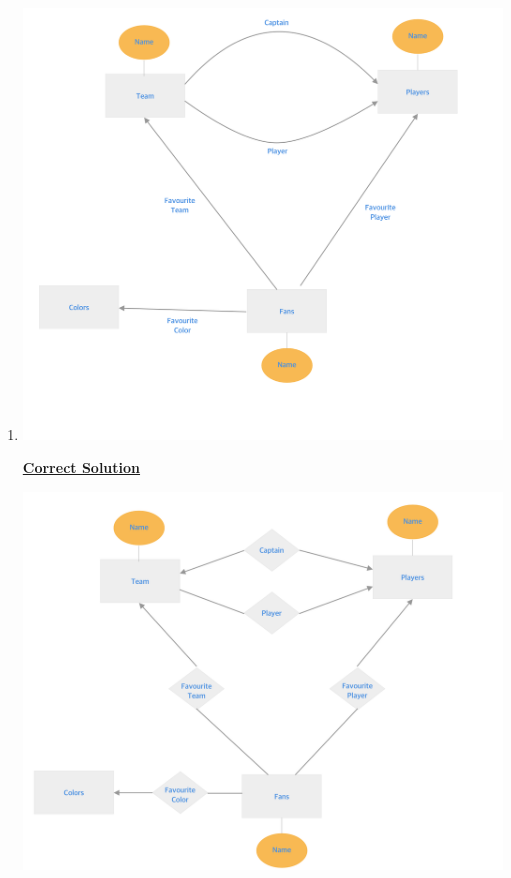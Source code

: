 \documentclass[12pt]{article}
\begin{document}
\begin{enumerate}[1.]
\begin{enumerate}[a)]
\begin{mdframed}
        \end{mdframed}

    \end{enumerate}

    \item

    \begin{center}
    \includegraphics[width=\linewidth]{images/worksheet_14_solution_23.png}
    \end{center}

    \bigskip

    \begin{mdframed}

        \underline{\textbf{Correct Solution}}

        \bigskip

        \begin{center}
        \includegraphics[width=\linewidth]{images/worksheet_14_solution_24.png}
        \end{center}


\end{mdframed}
\end{enumerate}
\end{document}
